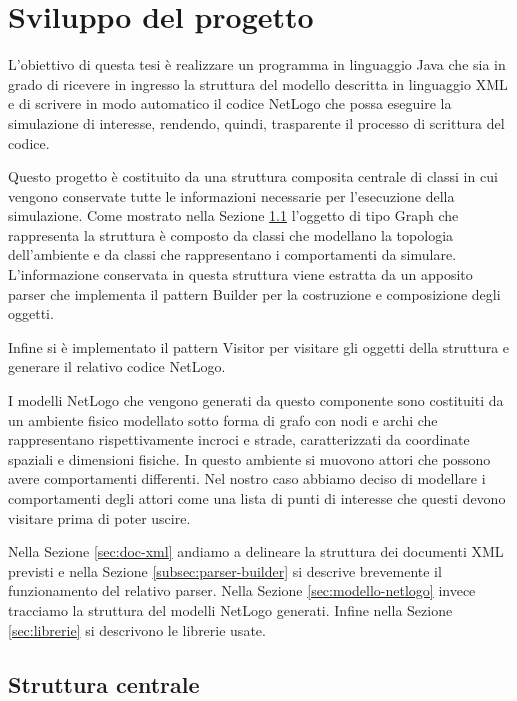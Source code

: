 \chapter{Sviluppo del progetto}
\label{cap:sviluppo-progetto}

L'obiettivo di questa tesi è realizzare un programma in linguaggio Java che sia in grado di ricevere in ingresso la struttura del modello descritta in linguaggio XML e di scrivere in modo automatico il codice NetLogo che possa eseguire la simulazione di interesse, rendendo, quindi, trasparente il processo di scrittura del codice.

Questo progetto è costituito da una struttura composita centrale di classi in cui vengono conservate tutte le informazioni necessarie per l'esecuzione della simulazione. Come mostrato nella Sezione \ref{sec:strttura-interna} l'oggetto di tipo Graph che rappresenta la struttura è composto da classi che modellano la topologia dell'ambiente e da classi che rappresentano i comportamenti da simulare. L'informazione conservata in questa struttura viene estratta da un apposito parser che implementa il pattern Builder per la costruzione e composizione degli oggetti.

Infine si è implementato il pattern Visitor per visitare gli oggetti della struttura e generare il relativo codice NetLogo.

I modelli NetLogo che vengono generati da questo componente sono costituiti da un ambiente fisico modellato sotto forma di grafo con nodi e archi che rappresentano rispettivamente incroci e strade, caratterizzati da coordinate spaziali e dimensioni fisiche. In questo ambiente si muovono attori che possono avere comportamenti differenti. Nel nostro caso abbiamo deciso di modellare i comportamenti degli attori come una lista di punti di interesse che questi devono visitare prima di poter uscire.

Nella Sezione \ref{sec:doc-xml} andiamo a delineare la struttura dei documenti XML previsti e nella Sezione \ref{subsec:parser-builder} si descrive brevemente il funzionamento del relativo parser. Nella Sezione \ref{sec:modello-netlogo} invece tracciamo la struttura del modelli NetLogo generati. Infine nella Sezione \ref{sec:librerie} si descrivono le librerie usate.

\section{Struttura centrale}
\label{sec:strttura-interna}

